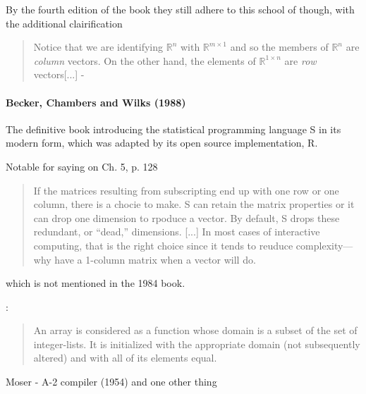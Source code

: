 
By the fourth edition of the book they still adhere to this school of though,
with the additional clairification
%
\begin{quote}
Notice that we are identifying $\mathbb R^n$ with $\mathbb R^{m\times1}$ and so the members of $\mathbb R^n$ are
\textit{column} vectors. On the other hand, the elements of $\mathbb R^{1\times n}$ are \textit{row} vectors[...]
- \cite[p. 3]{Golub2013}
\end{quote}
%


\paragraph{Becker, Chambers and Wilks (1988)~\cite{Becker1988}}

The definitive book introducing the statistical programming language S in its
modern form, which was adapted by its open source implementation, R.

Notable for saying on Ch. 5, p. 128

\begin{quote}
If the matrices resulting from subscripting end up with one row or one
column, there is a chocie to make. S can retain the matrix properties or it can
drop one dimension to rpoduce a vector. By default, S drops these redundant,
or ``dead,'' dimensions. [...]
In most cases of interactive computing, that is the right choice since it tends to
reuduce complexity---why have a 1-column matrix when a vector will do.
\end{quote}

which is not mentioned in the 1984 book.







\cite{Landin1965}:
\begin{quote}
An array is considered as a function whose domain is a subset of the set of integer-lists.
It is initialized with the appropriate domain (not subsequently altered) and with all of its elements equal.
\end{quote}


Moser - A-2 compiler (1954) and one other thing

